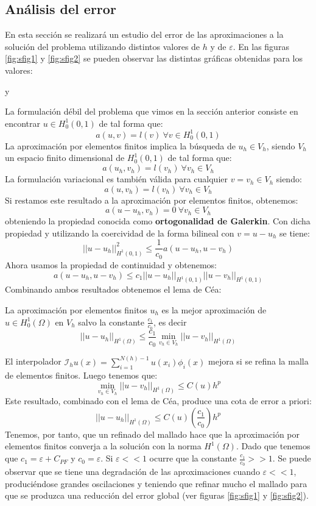 \documentclass[spanish]{mathnotes}
\begin{document}
	\subsection{Análisis del error}
	En esta sección se realizará un estudio del error de las aproximaciones a la solución del problema utilizando distintos valores de $h$ y de $\varepsilon$. En las figuras \ref{fig:sfig1} y \ref{fig:sfig2} se pueden observar las distintas gráficas obtenidas para los valores:
	\begin{center}	
		 y 
	\end{center}
	La formulación débil del problema que vimos en la sección anterior consiste en encontrar $u\in H_0^1(0,1)$ de tal forma que:
	$$a(u,v) = l(v)\ \forall v\in H_0^1(0,1)$$
	La aproximación por elementos finitos implica la búsqueda de $u_h\in V_h$, siendo $V_h$ un espacio finito dimensional de $H_0^1(0,1)$ de tal forma que:
	$$a(u_h, v_h) = l(v_h) \ \forall v_h\in V_h$$
	La formulación variacional es también válida para cualquier $v=v_h\in V_h$ siendo:
	$$a(u, v_h) = l(v_h)\ \forall v_h\in V_h$$
	Si restamos este resultado a la aproximación por elementos finitos, obtenemos:
	$$a(u-u_h, v_h) = 0\ \forall v_h\in V_h$$
	obteniendo la propiedad conocida como \textbf{ortogonalidad de Galerkin}.
	Con dicha propiedad y utilizando la coercividad de la forma bilineal con $v=u-u_h$ se tiene:
	$$||u-u_h||_{H^1(0,1)}^2\le \frac{1}{c_0}a(u-u_h, u-v_h)$$
	Ahora usamos la propiedad de continuidad y obtenemos:
	$$a(u-u_h, u-v_h)\le c_1||u-u_h||_{H^1(0,1)}||u-v_h||_{H^1(0,1)}$$
	Combinando ambos resultados obtenemos el lema de Céa:
	\begin{lemma}
		La aproximación por elementos finitos $u_h$ es la mejor aproximación de $u\in H_0^1(\Omega)$ en $V_h$ salvo la constante $\frac{c_1}{c_0}$, es decir
		$$||u-u_h||_{H^1(\Omega)}\le \frac{c_1}{c_0}\min_{v_h\in V_h}||u-v_h||_{H^1(\Omega)}$$
	\end{lemma}
	El interpolador $\mathcal{I}_h u(x) = \sum_{i=1}^{N(h)-1} u(x_i)\phi_i(x)$ mejora si se refina la malla de elementos finitos. Luego tenemos que:
	$$\min_{v_h\in V_h} ||u-v_h||_{H^1(\Omega)} \le C(u)h^p$$
	Este resultado, combinado con el lema de Céa, produce una cota de error a priori:
	$$||u-u_h||_{H^1(\Omega)}\le C(u)\left(\frac{c_1}{c_0}\right)h^p$$
	Tenemos, por tanto, que un refinado del mallado hace que la aproximación por elementos finitos converja a la solución con la norma $H^1(\Omega)$.
	\newpage
	Dado que tenemos que $c_1=\varepsilon + C_{PF}$ y $c_0 = \varepsilon$. Si $\varepsilon << 1$ ocurre que la constante $\frac{c_1}{c_0} >> 1$. Se puede observar que se tiene una degradación de las aproximaciones cuando $\varepsilon << 1$, produciéndose grandes oscilaciones y teniendo que refinar mucho el mallado para que se produzca una reducción del error global (ver figuras \ref{fig:sfig1} y \ref{fig:sfig2}).
\end{document}
